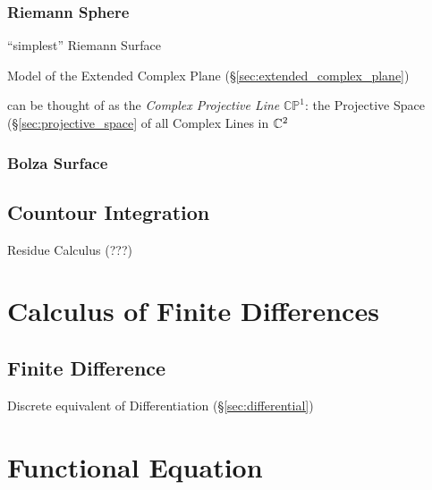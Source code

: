 \subsubsection{Riemann Sphere}\label{sec:riemann_sphere}

``simplest'' Riemann Surface

Model of the Extended Complex Plane
(\S\ref{sec:extended_complex_plane})

can be thought of as the \emph{Complex Projective Line}
$\mathbb{CP}^1$: the Projective Space (\S\ref{sec:projective_space} of
all Complex Lines in $\mathbb{C}^2$



\subsubsection{Bolza Surface}\label{sec:bolza_surface}



\subsection{Countour Integration}\label{sec:contour_integration}

Residue Calculus (???) %



\section{Calculus of Finite Differences}\label{sec:finite_differences_calculus}


\subsection{Finite Difference}\label{sec:finite_difference}

Discrete equivalent of Differentiation (\S\ref{sec:differential})



\section{Functional Equation}\label{sec:functional_equation}

